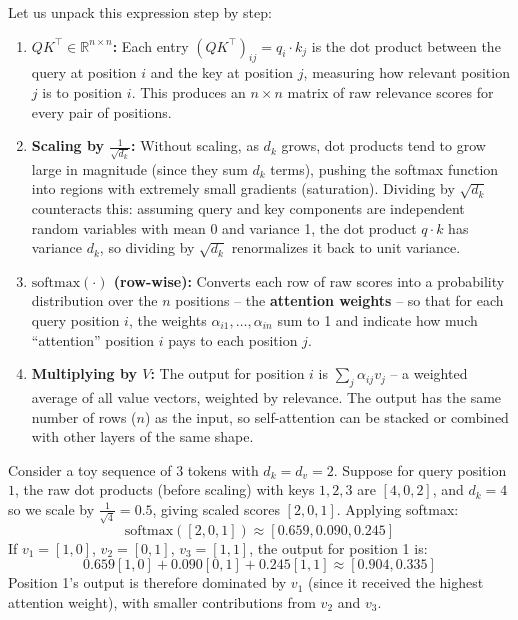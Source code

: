 \documentclass[11pt]{article}
\begin{document}
Let us unpack this expression step by step:

\begin{enumerate}[leftmargin=1.5em]
    \item \textbf{$QK^\top \in \mathbb{R}^{n\times n}$:} Each entry $(QK^\top)_{ij} = q_i \cdot k_j$ is the dot product between the query at position $i$ and the key at position $j$, measuring how relevant position $j$ is to position $i$. This produces an $n \times n$ matrix of raw relevance scores for every pair of positions.
    \item \textbf{Scaling by $\frac{1}{\sqrt{d_k}}$:} Without scaling, as $d_k$ grows, dot products tend to grow large in magnitude (since they sum $d_k$ terms), pushing the softmax function into regions with extremely small gradients (saturation). Dividing by $\sqrt{d_k}$ counteracts this: assuming query and key components are independent random variables with mean 0 and variance 1, the dot product $q\cdot k$ has variance $d_k$, so dividing by $\sqrt{d_k}$ renormalizes it back to unit variance.
    \item \textbf{$\text{softmax}(\cdot)$ (row-wise):} Converts each row of raw scores into a probability distribution over the $n$ positions -- the \textbf{attention weights} -- so that for each query position $i$, the weights $\alpha_{i1}, \ldots, \alpha_{in}$ sum to 1 and indicate how much ``attention'' position $i$ pays to each position $j$.
    \item \textbf{Multiplying by $V$:} The output for position $i$ is $\sum_j \alpha_{ij} v_j$ -- a weighted average of all value vectors, weighted by relevance. The output has the same number of rows ($n$) as the input, so self-attention can be stacked or combined with other layers of the same shape.
\end{enumerate}

\begin{example}
Consider a toy sequence of 3 tokens with $d_k = d_v = 2$. Suppose for query position $1$, the raw dot products (before scaling) with keys $1, 2, 3$ are $[4, 0, 2]$, and $d_k = 4$ so we scale by $\frac{1}{\sqrt{4}} = 0.5$, giving scaled scores $[2, 0, 1]$. Applying softmax:
\[
\text{softmax}([2,0,1]) \approx [0.659, 0.090, 0.245]
\]
If $v_1 = [1,0]$, $v_2=[0,1]$, $v_3=[1,1]$, the output for position 1 is:
\[
0.659[1,0] + 0.090[0,1] + 0.245[1,1] \approx [0.904, 0.335]
\]
Position 1's output is therefore dominated by $v_1$ (since it received the highest attention weight), with smaller contributions from $v_2$ and $v_3$.
\end{example}
\end{document}
